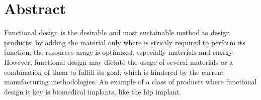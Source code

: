 \chapter*{Abstract}
Functional design is the desirable and most sustainable method to design
products: by adding the material only where is strictly required to perform its
function, the resources usage is optimized, especially materials and
energy. However, functional design may dictate the usage of several materials or a combination of them to fulfill its goal, which is hindered by the
current manufacturing methodologies. An example of a class of
products where functional design is key is biomedical implants, like the hip implant.

